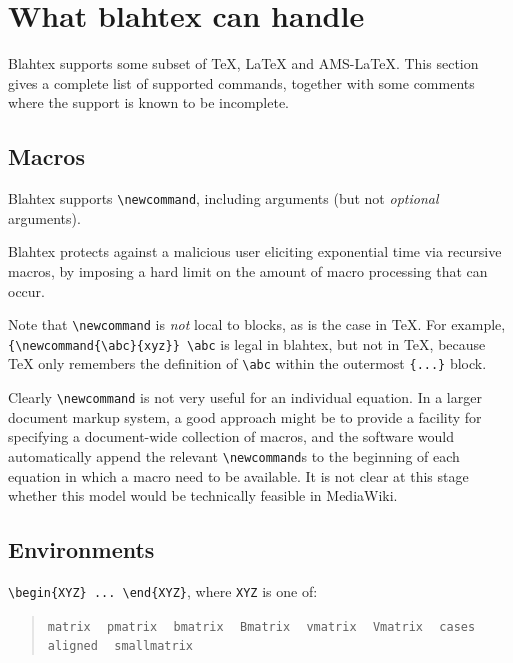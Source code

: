 \documentclass{article}
\newcommand{\texcommand}[1]{\textbackslash{}#1}
\newcommand{\spacer}{\,\,\, \hfil}
\newcommand{\lastspacer}{\hfill\hfill\hfill}
\newenvironment{mylist}{\begin{quote}}{\end{quote}}
\begin{document}
\section{What blahtex can handle}\label{sec:handle}

Blahtex supports some subset of \TeX{}, \LaTeX{} and AMS-\LaTeX{}. This section gives a complete list of supported commands, together with some comments where the support is known to be incomplete.

\subsection{Macros}

Blahtex supports \texttt{\texcommand{newcommand}}, including arguments (but not \emph{optional} arguments).

Blahtex protects against a malicious user eliciting exponential time via recursive macros, by imposing a hard limit on the amount of macro processing that can occur.

Note that \texttt{\texcommand{newcommand}} is \emph{not} local to blocks, as is the case in \TeX{}. For example, \texttt{\{\texcommand{newcommand}\{\texcommand{abc}\}\{xyz\}\}  \texcommand{abc}} is legal in blahtex, but not in \TeX{}, because \TeX{} only remembers the definition of \texttt{\texcommand{abc}} within the outermost \texttt{\{...\}} block.

Clearly \texttt{\texcommand{newcommand}} is not very useful for an individual equation. In a larger document markup system, a good approach might be to provide a facility for specifying a document-wide collection of macros, and the software would automatically append the relevant \texttt{\texcommand{newcommand}}s to the beginning of each equation in which a macro need to be available. It is not clear at this stage whether this model would be technically feasible in MediaWiki.

\subsection{Environments}

\texttt{\texcommand{begin}\{XYZ\} ... \texcommand{end}\{XYZ\}}, where \texttt{XYZ} is one of: 

\begin{mylist}
\texttt{matrix} \spacer
\texttt{pmatrix} \spacer
\texttt{bmatrix} \spacer
\texttt{Bmatrix} \spacer
\texttt{vmatrix} \spacer
\texttt{Vmatrix} \spacer
\texttt{cases} \spacer
\texttt{aligned} \spacer
\texttt{smallmatrix} \lastspacer
\end{mylist}
\end{document}
